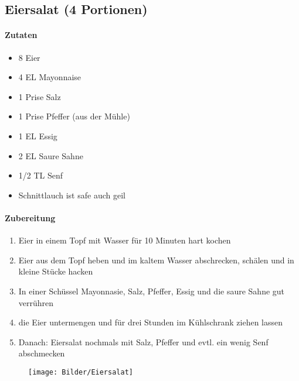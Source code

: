 \newpage
\subsection{Eiersalat (4 Portionen)}
\paragraph{Zutaten}
\begin{itemize}[noitemsep]
	\item 8 Eier
	\item 4 EL Mayonnaise
	\item 1 Prise Salz
	\item 1 Prise Pfeffer (aus der Mühle)
	\item 1 EL Essig
	\item 2 EL Saure Sahne
	\item 1/2 TL Senf
	\item Schnittlauch ist safe auch geil
\end{itemize}
\paragraph{Zubereitung}
\begin{enumerate}[noitemsep]
	\item Eier in einem Topf mit Wasser für 10 Minuten hart kochen
	\item Eier aus dem Topf heben und im kaltem Wasser abschrecken, schälen und in kleine Stücke hacken
	\item In einer Schüssel Mayonnasie, Salz, Pfeffer, Essig und die saure Sahne gut verrühren
	\item die Eier untermengen und für drei Stunden im Kühlschrank ziehen lassen
	\item Danach: Eiersalat nochmals mit Salz, Pfeffer und evtl. ein wenig Senf abschmecken
\end{enumerate}
\vspace{1cm}
\begin{figure}[h]
\centering
\texttt{[image: Bilder/Eiersalat]}
\end{figure}